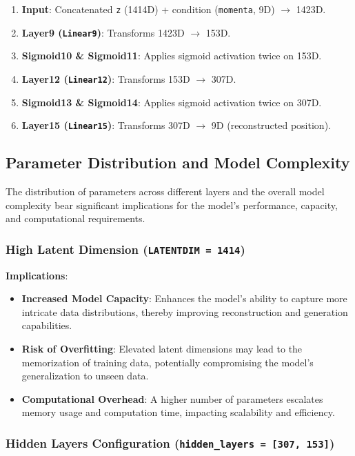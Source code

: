 \documentclass[10pt]{article}
\begin{document}
\begin{enumerate}
    \item \textbf{Input}: Concatenated \texttt{z} (1414D) + condition (\texttt{momenta}, 9D) $\rightarrow$ 1423D.
    \item \textbf{Layer9 (\texttt{Linear9})}: Transforms 1423D $\rightarrow$ 153D.
    \item \textbf{Sigmoid10 \& Sigmoid11}: Applies sigmoid activation twice on 153D.
    \item \textbf{Layer12 (\texttt{Linear12})}: Transforms 153D $\rightarrow$ 307D.
    \item \textbf{Sigmoid13 \& Sigmoid14}: Applies sigmoid activation twice on 307D.
    \item \textbf{Layer15 (\texttt{Linear15})}: Transforms 307D $\rightarrow$ 9D (reconstructed position).
\end{enumerate}

\subsection{Parameter Distribution and Model Complexity}

The distribution of parameters across different layers and the overall model complexity bear significant implications for the model's performance, capacity, and computational requirements.

\subsubsection{High Latent Dimension (\texttt{LATENTDIM = 1414})}

\textbf{Implications}:

\begin{itemize}
    \item \textbf{Increased Model Capacity}: Enhances the model's ability to capture more intricate data distributions, thereby improving reconstruction and generation capabilities.
    \item \textbf{Risk of Overfitting}: Elevated latent dimensions may lead to the memorization of training data, potentially compromising the model's generalization to unseen data.
    \item \textbf{Computational Overhead}: A higher number of parameters escalates memory usage and computation time, impacting scalability and efficiency.
\end{itemize}

\subsubsection{Hidden Layers Configuration (\texttt{hidden\_layers = [307, 153]})}
\end{document}
